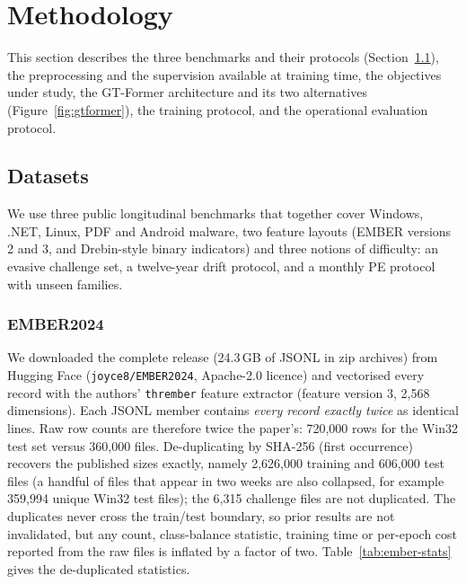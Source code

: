 \documentclass[fleqn,10pt]{wlscirep}
\newcommand{\gtf}{GT\mbox{-}Former}
\begin{document}
\section{Methodology}
\label{sec:methods}

This section describes the three benchmarks and their protocols (Section~\ref{sec:data}), the preprocessing and the supervision available at training time, the objectives under study, the \gtf{} architecture and its two alternatives (Figure~\ref{fig:gtformer}), the training protocol, and the operational evaluation protocol.

\subsection{Datasets}
\label{sec:data}

We use three public longitudinal benchmarks that together cover Windows, .NET, Linux, PDF and Android malware, two feature layouts (EMBER versions 2 and 3, and Drebin-style binary indicators) and three notions of difficulty: an evasive challenge set, a twelve-year drift protocol, and a monthly PE protocol with unseen families.

\subsubsection{EMBER2024}
\label{sec:dedup}
We downloaded the complete release (24.3\,GB of JSONL in zip archives) from Hugging Face (\texttt{joyce8/EMBER2024}, Apache-2.0 licence) and vectorised every record with the authors' \texttt{thrember} feature extractor (feature version 3, 2,568 dimensions). Each JSONL member contains \emph{every record exactly twice} as identical lines. Raw row counts are therefore twice the paper's: 720,000 rows for the Win32 test set versus 360,000 files. De-duplicating by SHA-256 (first occurrence) recovers the published sizes exactly, namely 2,626,000 training and 606,000 test files (a handful of files that appear in two weeks are also collapsed, for example 359,994 unique Win32 test files); the 6,315 challenge files are not duplicated. The duplicates never cross the train/test boundary, so prior results are not invalidated, but any count, class-balance statistic, training time or per-epoch cost reported from the raw files is inflated by a factor of two. Table~\ref{tab:ember-stats} gives the de-duplicated statistics.
\end{document}
